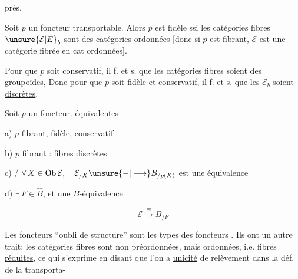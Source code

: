 
 près.

Soit \(p\) un foncteur transportable. Alors \(p\) est fidèle ssi les catégories fibres \(\unsure{\mathcal E|E}_b\) sont des catégories ordonnées [donc si \(p\) est fibrant, \(\mathcal E\) est une catégorie fibrée en cat ordonnées].

Pour que \(p\) soit conservatif, il f. et s. que les catégories fibres soient des groupoïdes, \deleted{[ou encore que tout morphisme de \(\mathcal E\times_{\unsure{B|\mathcal B}} B^{\mathrm{is}}\) soit cartésien,} Donc pour que \(p\) soit fidèle et conservatif, il f. et s. que les \(\mathcal E_b\) soient \uline{discrètes}.

Soit \(p\) un foncteur.   équivalentes

a) \(p\) fibrant, fidèle, conservatif

b) \(p\) fibrant : fibres discrètes

c)   / \(\forall\,X\in\operatorname{Ob}\mathcal E,\quad\mathcal E_{/X}\unsure{-|\longrightarrow} B_{/p(X)}\) est une équivalence


d) \(\exists\,F\in\widehat B\), et une \(B\)-équivalence

\[
\mathcal E\xrightarrow{\approx} B_{/F}
\]

Les foncteurs ``oubli de structure'' sont les types des foncteurs    . Ils ont un autre trait: les catégories fibres sont non  préordonnées, mais ordonnées, i.e.  fibres \uline{réduites}, ce qui s'exprime  en disant  que l'on a \uline{unicité} de relèvement dans la déf. de la transporta-
